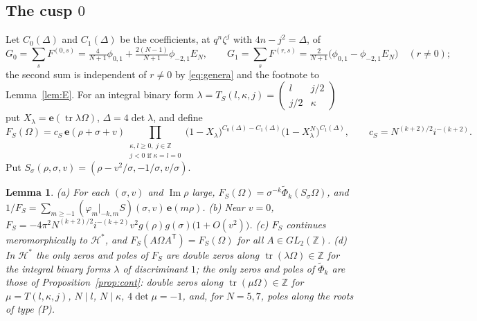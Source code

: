 \documentclass[11pt]{amsart}
\numberwithin{equation}{section}
\theoremstyle{plain}
\newtheorem{lem}[thm]{Lemma}
\theoremstyle{definition}
\theoremstyle{remark}
\newcommand{\Z}{\mathbb{Z}}
\newcommand{\e}{\mathbf{e}}
\newcommand{\pmi}{\phi_{-2,1}}
\newcommand{\pz}{\phi_{0,1}}
\newcommand{\tPhi}{\widetilde{\Phi}}
\newcommand{\sm}[4]{\left(\begin{smallmatrix}#1&#2\\#3&#4\end{smallmatrix}\right)}
\begin{document}
\subsection{The cusp $0$}\label{app:cusp0}
Let $C_0(\Delta)$ and $C_1(\Delta)$ be the coefficients, at $q^n\zeta^j$ with $4n-j^2=\Delta$, of
\[
G_0=\sum_sF^{(0,s)}=\tfrac4{N+1}\pz+\tfrac{2(N-1)}{N+1}\pmi E_N,\qquad G_1=\sum_sF^{(r,s)}=\tfrac2{N+1}\bigl(\pz-\pmi E_N\bigr)\quad(r\ne0);
\]
the second sum is independent of $r\ne0$ by \eqref{eq:genera} and the footnote to Lemma~\ref{lem:E}. For an integral binary form $\lambda=T_S(l,\kappa,j)=\sm l{j/2}{j/2}\kappa$ put $X_\lambda=\e(\operatorname{tr}\lambda\Omega)$, $\Delta=4\det\lambda$, and define
\begin{equation}\label{eq:FSprod}
F_S(\Omega)=c_S\,\e(\rho+\sigma+v)\prod_{\substack{\kappa,l\ge0,\ j\in\Z\\ j<0\text{ if }\kappa=l=0}}\bigl(1-X_\lambda\bigr)^{C_0(\Delta)-C_1(\Delta)}\bigl(1-X_\lambda^N\bigr)^{C_1(\Delta)},\qquad c_S=N^{(k+2)/2}i^{-(k+2)} .
\end{equation}
Put $S_\sigma(\rho,\sigma,v)=(\rho-v^2/\sigma,-1/\sigma,v/\sigma)$.

\begin{lem}\label{lem:FS}
\textup{(a)} For each $(\sigma,v)$ and $\operatorname{Im}\rho$ large, $F_S(\Omega)=\sigma^{-k}\tPhi_k(S_\sigma\Omega)$, and $1/F_S=\sum_{m\ge-1}(\varphi_m|_{-k,m}S)(\sigma,v)\,\e(m\rho)$.
\textup{(b)} Near $v=0$, $F_S=-4\pi^2N^{(k+2)/2}i^{-(k+2)}v^2g(\rho)g(\sigma)\bigl(1+O(v^2)\bigr)$.
\textup{(c)} $F_S$ continues meromorphically to $\mathcal H^*$, and $F_S(A\Omega A^{\mathsf T})=F_S(\Omega)$ for all $A\in GL_2(\Z)$.
\textup{(d)} In $\mathcal H^*$ the only zeros and poles of $F_S$ are double zeros along $\operatorname{tr}(\lambda\Omega)\in\Z$ for the integral binary forms $\lambda$ of discriminant $1$; the only zeros and poles of $\tPhi_k$ are those of Proposition~\ref{prop:cont}: double zeros along $\operatorname{tr}(\mu\Omega)\in\Z$ for $\mu=T(l,\kappa,j)$, $N\mid l$, $N\mid\kappa$, $4\det\mu=-1$, and, for $N=5,7$, poles along the roots of type \textup{(P)}.
\end{lem}
\end{document}

